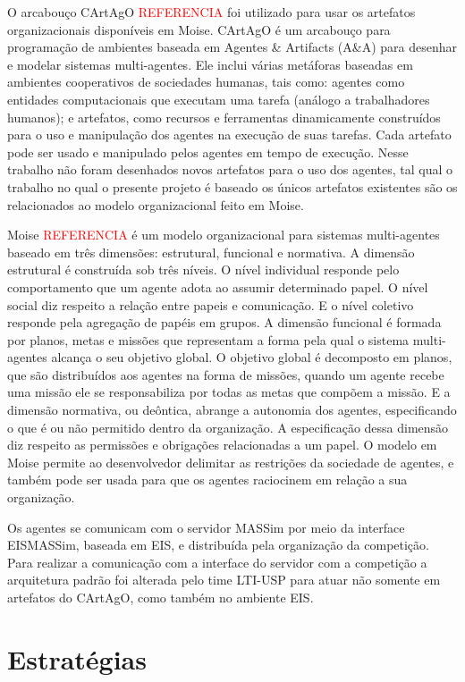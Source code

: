 \documentclass{llncs}
\begin{document}
O arcabouço CArtAgO \textcolor{red}{REFERENCIA} foi utilizado para usar os artefatos organizacionais disponíveis em Moise. CArtAgO é um arcabouço para programação de ambientes baseada em Agentes \& Artifacts (A\&A) para desenhar e modelar sistemas multi-agentes. Ele inclui várias metáforas baseadas em ambientes cooperativos de sociedades humanas, tais como: agentes como entidades computacionais que executam uma tarefa (análogo a trabalhadores humanos); e artefatos, como recursos e ferramentas dinamicamente construídos para o uso e manipulação dos agentes na execução de suas tarefas. Cada artefato pode ser usado e manipulado pelos agentes em tempo de execução. Nesse trabalho não foram desenhados novos artefatos para o uso dos agentes, tal qual o trabalho no qual o presente projeto é baseado os únicos artefatos existentes são os relacionados ao modelo organizacional feito em Moise.

Moise \textcolor{red}{REFERENCIA} é um modelo organizacional para sistemas multi-agentes baseado em três dimensões: estrutural, funcional e normativa. A dimensão estrutural é construída sob três níveis. O nível individual responde pelo comportamento que um agente adota ao assumir determinado papel. O nível social diz respeito a relação entre papeis e comunicação. E o nível coletivo responde pela agregação de papéis em grupos. A dimensão funcional é formada por planos, metas e missões que representam a forma pela qual o sistema multi-agentes alcança o seu objetivo global. O objetivo global é decomposto em planos, que são distribuídos aos agentes na forma de missões, quando um agente recebe uma missão ele se responsabiliza por todas as metas que compõem a missão. E a dimensão normativa, ou deôntica, abrange a autonomia dos agentes, especificando o que é ou não permitido dentro da organização. A especificação dessa dimensão diz respeito as permissões e obrigações relacionadas a um papel. O modelo em Moise permite ao desenvolvedor delimitar as restrições da sociedade de agentes, e também pode ser usada para que os agentes raciocinem em relação a sua organização.

Os agentes se comunicam com o servidor MASSim por meio da interface EISMASSim, baseada em EIS, e distribuída pela organização da competição. Para realizar a comunicação com a interface do servidor com a competição a arquitetura padrão foi alterada pelo time LTI-USP para atuar não somente em artefatos do CArtAgO, como também no ambiente EIS.

\section{Estratégias}\label{sec:strategies}
\end{document}
